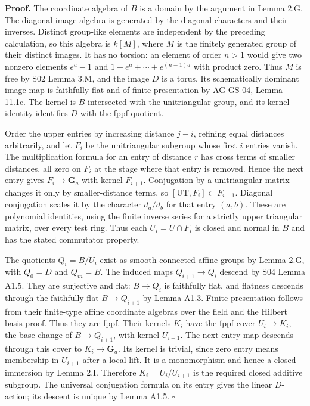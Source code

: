 \documentclass[11pt,a4paper,openany]{report}
\begin{document}
\textbf{Proof.} The coordinate algebra of \(B\) is a domain by the argument in Lemma 2.G. The diagonal image algebra is generated by the diagonal characters and their inverses. Distinct group-like elements are independent by the preceding calculation, so this algebra is \(k[M]\), where \(M\) is the finitely generated group of their distinct images. It has no torsion: an element of order \(n>1\) would give two nonzero elements \(e^a-1\) and \(1+e^a+\cdots+e^{(n-1)a}\) with product zero. Thus \(M\) is free by S02 Lemma 3.M, and the image \(D\) is a torus. Its schematically dominant image map is faithfully flat and of finite presentation by AG-GS-04, Lemma 11.1c. The kernel is \(B\) intersected with the unitriangular group, and its kernel identity identifies \(D\) with the fppf quotient.

Order the upper entries by increasing distance \(j-i\), refining equal distances arbitrarily, and let \(F_i\) be the unitriangular subgroup whose first \(i\) entries vanish. The multiplication formula for an entry of distance \(r\) has cross terms of smaller distances, all zero on \(F_i\) at the stage where that entry is removed. Hence the next entry gives \(F_i\to\mathbf G_a\) with kernel \(F_{i+1}\). Conjugation by a unitriangular matrix changes it only by smaller-distance terms, so \([\mathrm{UT},F_i]\subset F_{i+1}\). Diagonal conjugation scales it by the character \(d_a/d_b\) for that entry \((a,b)\). These are polynomial identities, using the finite inverse series for a strictly upper triangular matrix, over every test ring. Thus each \(U_i=U\cap F_i\) is closed and normal in \(B\) and has the stated commutator property.

The quotients \(Q_i=B/U_i\) exist as smooth connected affine groups by Lemma 2.G, with \(Q_0=D\) and \(Q_m=B\). The induced maps \(Q_{i+1}\to Q_i\) descend by S04 Lemma A1.5. They are surjective and flat: \(B\to Q_i\) is faithfully flat, and flatness descends through the faithfully flat \(B\to Q_{i+1}\) by Lemma A1.3. Finite presentation follows from their finite-type affine coordinate algebras over the field and the Hilbert basis proof. Thus they are fppf. Their kernels \(K_i\) have the fppf cover \(U_i\to K_i\), the base change of \(B\to Q_{i+1}\), with kernel \(U_{i+1}\). The next-entry map descends through this cover to \(K_i\to\mathbf G_a\). Its kernel is trivial, since zero entry means membership in \(U_{i+1}\) after a local lift. It is a monomorphism and hence a closed immersion by Lemma 2.I. Therefore \(K_i=U_i/U_{i+1}\) is the required closed additive subgroup. The universal conjugation formula on its entry gives the linear \(D\)-action; its descent is unique by Lemma A1.5. \(\square\)
\end{document}
